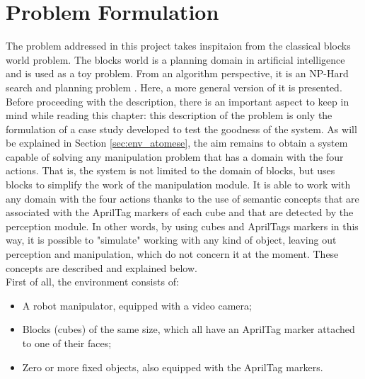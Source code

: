 \chapter{Problem Formulation} \label{cha:problem_description}

The problem addressed in this project takes inspitaion from the classical blocks world problem\footnotemark{}. 
The blocks world is a planning domain in artificial intelligence and is used as a toy problem. From an algorithm perspective, it is an NP-Hard search and planning problem \cite{Gupta1991ComplexityRF, Chenoweth1991OnTN}. Here, a more general version of it is presented. \\
Before proceeding with the description, there is an important aspect to keep in mind while reading this chapter: this description of the problem is only the formulation of a case study developed to test the goodness of the system. As will be explained in Section \ref{sec:env_atomese}, the aim remains to obtain a system capable of solving any manipulation problem that has a domain with the four actions. That is, the system is not limited to the domain of blocks, but uses blocks to simplify the work of the manipulation module. It is able to work with any domain with the four actions thanks to the use of semantic concepts that are associated with the AprilTag markers of each cube and that are detected by the perception module.
In other words, by using cubes and AprilTags markers in this way, it is possible to "simulate" working with any kind of object, leaving out perception and manipulation, which do not concern it at the moment. These concepts are described and explained below. \\

First of all, the environment consists of:
\begin{itemize}
	\item A robot manipulator, equipped with a video camera;
	\item Blocks (cubes) of the same size, which all have an AprilTag \cite{olson2011tags, wang2016iros} marker attached to one of their faces;
	\item Zero or more fixed objects, also equipped with the AprilTag markers.
\end{itemize}

